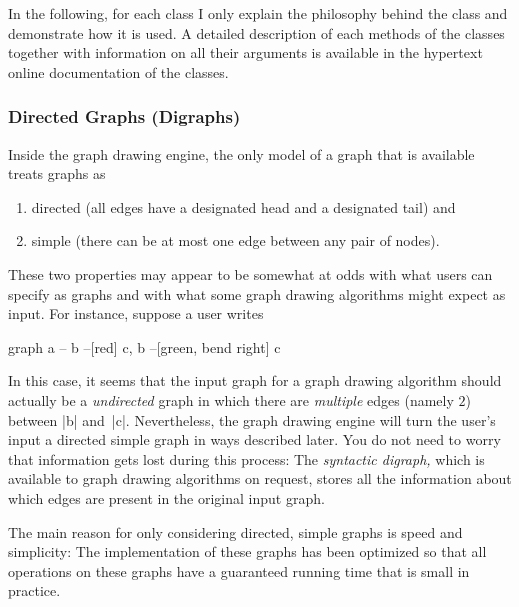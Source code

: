 In the following, for each class I only explain the philosophy behind
the class and demonstrate how it is used. A detailed description of
each methods of the classes together with information on all their
arguments is available in the hypertext online documentation of the
classes.


\subsubsection{Directed Graphs (Digraphs)}

Inside the graph drawing engine, the only model of a graph that is 
available treats graphs as
\begin{enumerate}
\item directed (all edges have a designated head and a designated
  tail) and
\item simple (there can be at most one edge between any pair of
  nodes). 
\end{enumerate}
These two properties may appear to be somewhat at odds with what users
can specify as graphs and with what some graph drawing algorithms
might expect as input. For instance, suppose a user writes
\begin{codeexample}
graph { a -- b --[red] c, b --[green, bend right] c }
\end{codeexample}
In this case, it seems that the input graph for a graph drawing
algorithm should actually be a \emph{undirected} graph in which there
are \emph{multiple} edges (namely $2$) between |b| and~|c|.
Nevertheless, the graph drawing engine will turn the user's input a
directed simple graph in ways described later. You do not need to
worry that information gets lost during this process: The
\emph{syntactic digraph,} which is available to graph drawing
algorithms on request, stores all the information about which edges
are present in the original input graph.

The main reason for only considering directed, simple graphs is speed
and simplicity: The implementation of these graphs has been optimized so
that all operations on these graphs have a guaranteed running time
that is small in practice. 

